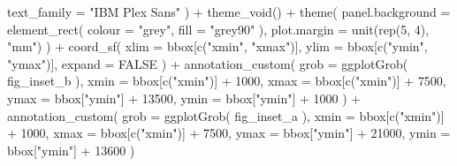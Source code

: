 \documentclass[]{article}
\newenvironment{Shaded}{}{}
\newcommand{\DataTypeTok}[1]{#1}
\newcommand{\DecValTok}[1]{#1}
\newcommand{\KeywordTok}[1]{\textcolor[rgb]{0.00,0.00,1.00}{#1}}
\newcommand{\NormalTok}[1]{#1}
\newcommand{\OperatorTok}[1]{#1}
\newcommand{\OtherTok}[1]{\textcolor[rgb]{1.00,0.25,0.00}{#1}}
\newcommand{\StringTok}[1]{\textcolor[rgb]{0.00,0.50,0.50}{#1}}
\begin{document}
\begin{Shaded}
\begin{Highlighting}[]
    \DataTypeTok{text_family =} \StringTok{"IBM Plex Sans"}
\NormalTok{  ) }\OperatorTok{+}
\StringTok{  }\KeywordTok{theme_void}\NormalTok{() }\OperatorTok{+}
\StringTok{  }\KeywordTok{theme}\NormalTok{(}
    \DataTypeTok{panel.background =} \KeywordTok{element_rect}\NormalTok{(}
      \DataTypeTok{colour =} \StringTok{"grey"}\NormalTok{,}
      \DataTypeTok{fill =} \StringTok{"grey90"}
\NormalTok{    ),}
    \DataTypeTok{plot.margin =} \KeywordTok{unit}\NormalTok{(}\KeywordTok{rep}\NormalTok{(}\DecValTok{5}\NormalTok{, }\DecValTok{4}\NormalTok{), }\StringTok{"mm"}\NormalTok{)}
\NormalTok{  ) }\OperatorTok{+}
\StringTok{  }\KeywordTok{coord_sf}\NormalTok{(}
    \DataTypeTok{xlim =}\NormalTok{ bbox[}\KeywordTok{c}\NormalTok{(}\StringTok{"xmin"}\NormalTok{, }\StringTok{"xmax"}\NormalTok{)],}
    \DataTypeTok{ylim =}\NormalTok{ bbox[}\KeywordTok{c}\NormalTok{(}\StringTok{"ymin"}\NormalTok{, }\StringTok{"ymax"}\NormalTok{)],}
    \DataTypeTok{expand =} \OtherTok{FALSE}
\NormalTok{  ) }\OperatorTok{+}
\StringTok{  }\KeywordTok{annotation_custom}\NormalTok{(}
    \DataTypeTok{grob =} \KeywordTok{ggplotGrob}\NormalTok{(}
\NormalTok{      fig_inset_b}
\NormalTok{    ),}
    \DataTypeTok{xmin =}\NormalTok{ bbox[}\KeywordTok{c}\NormalTok{(}\StringTok{"xmin"}\NormalTok{)] }\OperatorTok{+}\StringTok{ }\DecValTok{1000}\NormalTok{,}
    \DataTypeTok{xmax =}\NormalTok{ bbox[}\KeywordTok{c}\NormalTok{(}\StringTok{"xmin"}\NormalTok{)] }\OperatorTok{+}\StringTok{ }\DecValTok{7500}\NormalTok{,}
    \DataTypeTok{ymax =}\NormalTok{ bbox[}\StringTok{"ymin"}\NormalTok{] }\OperatorTok{+}\StringTok{ }\DecValTok{13500}\NormalTok{,}
    \DataTypeTok{ymin =}\NormalTok{ bbox[}\StringTok{"ymin"}\NormalTok{] }\OperatorTok{+}\StringTok{ }\DecValTok{1000}
\NormalTok{  ) }\OperatorTok{+}
\StringTok{  }\KeywordTok{annotation_custom}\NormalTok{(}
    \DataTypeTok{grob =} \KeywordTok{ggplotGrob}\NormalTok{(}
\NormalTok{      fig_inset_a}
\NormalTok{    ),}
    \DataTypeTok{xmin =}\NormalTok{ bbox[}\KeywordTok{c}\NormalTok{(}\StringTok{"xmin"}\NormalTok{)] }\OperatorTok{+}\StringTok{ }\DecValTok{1000}\NormalTok{,}
    \DataTypeTok{xmax =}\NormalTok{ bbox[}\KeywordTok{c}\NormalTok{(}\StringTok{"xmin"}\NormalTok{)] }\OperatorTok{+}\StringTok{ }\DecValTok{7500}\NormalTok{,}
    \DataTypeTok{ymax =}\NormalTok{ bbox[}\StringTok{"ymin"}\NormalTok{] }\OperatorTok{+}\StringTok{ }\DecValTok{21000}\NormalTok{,}
    \DataTypeTok{ymin =}\NormalTok{ bbox[}\StringTok{"ymin"}\NormalTok{] }\OperatorTok{+}\StringTok{ }\DecValTok{13600}
\NormalTok{  )}
\end{Highlighting}
\end{Shaded}
\end{document}
